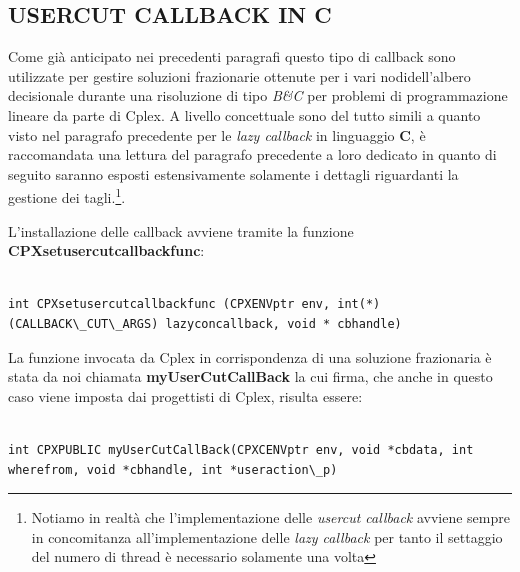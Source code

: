 \documentclass[11pt]{article}
\begin{document}
\subsection*{USERCUT CALLBACK IN C}

Come già anticipato nei precedenti paragrafi questo tipo di callback sono utilizzate per gestire soluzioni frazionarie ottenute per i vari nodidell'albero decisionale durante una risoluzione di tipo \textit{B\&C} per problemi di programmazione lineare da parte di Cplex. A livello concettuale sono del tutto simili a quanto visto nel paragrafo precedente per le \textit{lazy callback} in linguaggio \textbf{C}, è raccomandata una lettura del paragrafo precedente a loro dedicato in quanto di seguito saranno esposti estensivamente solamente i dettagli riguardanti la gestione dei tagli.\footnote{Notiamo in realtà che l'implementazione delle \textit{usercut callback} avviene sempre in concomitanza all'implementazione delle \textit{lazy callback} per tanto il settaggio del numero di thread è necessario solamente una volta}.

L'installazione delle callback avviene tramite la funzione \textbf{CPXsetusercutcallbackfunc}:

\begin{lstlisting}

int CPXsetusercutcallbackfunc (CPXENVptr env, int(*)(CALLBACK\_CUT\_ARGS) lazyconcallback, void * cbhandle)

\end{lstlisting}

La funzione invocata da Cplex in corrispondenza di una soluzione frazionaria è stata da noi chiamata \textbf{myUserCutCallBack} la cui firma, che anche in questo caso viene imposta dai progettisti di Cplex, risulta essere:

\begin{lstlisting}

int CPXPUBLIC myUserCutCallBack(CPXCENVptr env, void *cbdata, int wherefrom, void *cbhandle, int *useraction\_p)

\end{lstlisting}
\end{document}
